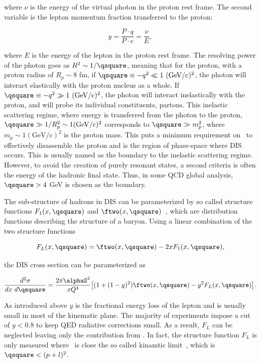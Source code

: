 where $\nu$ is the energy of the virtual photon in the proton rest frame. The second variable is the lepton momentum fraction transferred to the proton:

\begin{equation}
y = \frac{P\cdot q}{P \cdot e} = \frac{\nu}{E},
\label{eqn:ydis}
\end{equation}

where $E$ is the energy of the lepton in the proton rest frame. The resolving power of the photon goes as $R^{2} \sim 1/\qsquare$, meaning that for the proton, with a proton radius of $R_{p}\sim8$ fm, if $\qsquare \equiv -q^{2} \ll 1\ \mathrm{(GeV/c)^2}$, the photon will interact elastically with the proton nucleus as a whole. If $\qsquare \equiv -q^{2} \gg 1\ \mathrm{(GeV/c)^2}$, the photon will interact inelastically with the proton, and will probe its individual constituents, partons. This inelastic scattering regime, where energy is transferred from the photon to the proton,   $\qsquare \gg 1/R_{p}^{2} \sim 1 \mathrm{(GeV/c)^2}$ corresponds to $\qsquare \gg m_{p}^{2}$, where $m_{p} \sim 1 \mathrm{(GeV/c)^2}$ is the proton mass. This puts a minimum requirement on \qsquare\ to effectively disassemble the proton and is the region of phase-space where DIS occurs. This is usually named as the boundary to the inelastic scattering regime. However, to avoid the creation of purely resonant states, a second criteria is often the energy of the hadronic final state. Thus, in some QCD global analysis, $\qsquare>4$ GeV is chosen as the boundary.

The sub-structure of hadrons in DIS can be parameterized by so called structure functions $F_{1}(x,\qsquare)$ and $\ftwo(x,\qsquare)$~\cite{Kovchegov:2012mbw}, which are distribution functions describing the structure of a baryon. Using a linear combination of the two structure functions

\begin{equation}
F_{L}(x,\qsquare) = \ftwo(x,\qsquare) - 2xF_{1}(x,\qsquare),
\end{equation}

the DIS cross section can be parameterized as  

\begin{eqnarray}
\frac{d^{2}\sigma}{dx\ d\qsquare} = \frac{2\pi\alphaS^{2}}{xQ^{4}}\big[(1 + (1-y)^{2})\ftwo(x,\qsquare) - y^{2}F_{L}(x,\qsquare)\big].
\label{eqn:discrosssection}
\end{eqnarray}
	
	
As introduced above $y$ is the fractional energy loss of the lepton and is usually small in most of the kinematic plane. The majority of experiments impose a cut of $y < 0.8$ to keep QED radiative corrections small. As a result, $F_{L}$ can be neglected leaving only the  contribution from \ftwo. In fact, the structure function $F_{L}$ is only measured where \qsquare\ is close the so called kinamtic limit~\cite{Seymour:2005hs}, which is $\qsquare < (p + l)^2$. 


